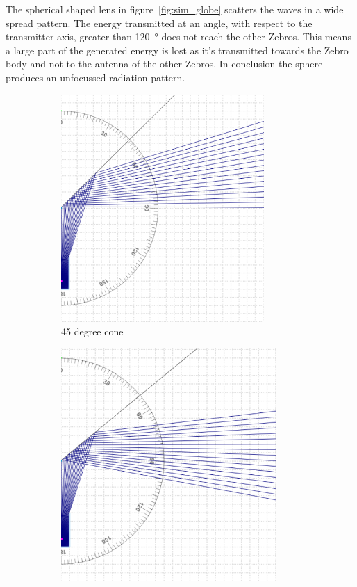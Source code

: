 The spherical shaped lens in figure~\ref{fig:sim_globe} scatters the waves in a wide spread pattern.
The energy transmitted at an angle, with respect to the transmitter axis, greater than \SI{120}{\degree} does not reach the other Zebros.
This means a large part of the generated energy is lost as it's transmitted towards the Zebro body and not to the antenna of the other Zebros.
In conclusion the sphere produces an unfocussed radiation pattern.

\begin{figure}[H]
\centering
\begin{subfigure}{.5\textwidth}
  \centering
  \includegraphics[width=0.85\textwidth]{Figures/sim_cone_45.PNG}
  \caption{45 degree cone}
  \label{fig:sim_cone_45}
\end{subfigure}%
\begin{subfigure}{.5\textwidth}
  \centering
  \includegraphics[width=0.9\textwidth]{Figures/sim_cone_50.PNG}

\end{subfigure}
\end{figure}
